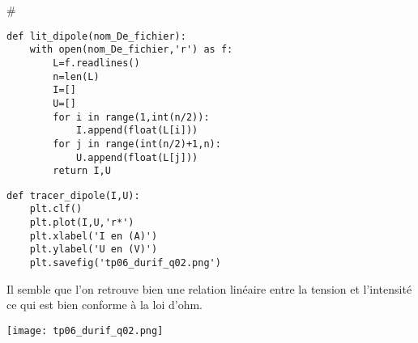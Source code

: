 \setcounter{numques}{0}#~\\

\question{}

\begin{lstlisting}
def lit_dipole(nom_De_fichier):
    with open(nom_De_fichier,'r') as f:
        L=f.readlines()
        n=len(L)
        I=[]
        U=[]
        for i in range(1,int(n/2)):
            I.append(float(L[i]))
        for j in range(int(n/2)+1,n):
            U.append(float(L[j]))
        return I,U
\end{lstlisting}

\question{}

\begin{lstlisting}
def tracer_dipole(I,U):
    plt.clf()
    plt.plot(I,U,'r*')
    plt.xlabel('I en (A)')
    plt.ylabel('U en (V)')
    plt.savefig('tp06_durif_q02.png')
\end{lstlisting}



\question{}

Il semble que l'on retrouve bien une relation linéaire entre la tension et l'intensité ce qui est bien conforme à la loi d'ohm.
\begin{center}
\texttt{[image: tp06\_durif\_q02.png]}
\end{center}
